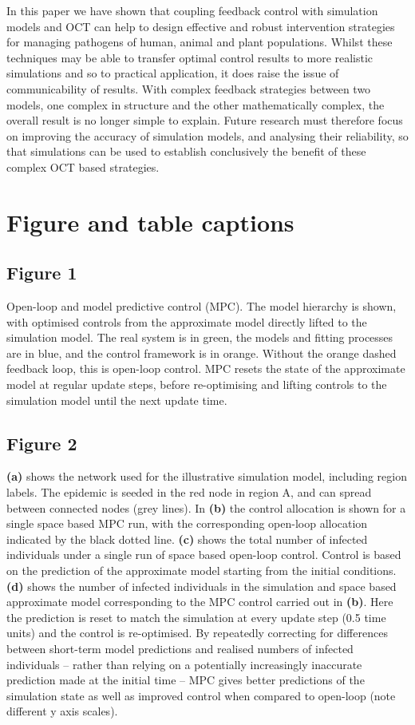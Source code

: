 In this paper we have shown that coupling feedback control with simulation models and OCT can help to design effective and robust intervention strategies for managing pathogens of human, animal and plant populations. Whilst these techniques may be able to transfer optimal control results to more realistic simulations and so to practical application, it does raise the issue of communicability of results. With complex feedback strategies between two models, one complex in structure and the other mathematically complex, the overall result is no longer simple to explain. Future research must therefore focus on improving the accuracy of simulation models, and analysing their reliability, so that simulations can be used to establish conclusively the benefit of these complex OCT based strategies.

\section*{Figure and table captions}

\subsection*{Figure 1}

Open-loop and model predictive control (MPC). The model hierarchy is shown, with optimised controls from the approximate model directly lifted to the simulation model. The real system is in green, the models and fitting processes are in blue, and the control framework is in orange. Without the orange dashed feedback loop, this is open-loop control. MPC resets the state of the approximate model at regular update steps, before re-optimising and lifting controls to the simulation model until the next update time.

\subsection*{Figure 2}

\textbf{(a)} shows the network used for the illustrative simulation model, including region labels. The epidemic is seeded in the red node in region A, and can spread between connected nodes (grey lines). In \textbf{(b)} the control allocation is shown for a single space based MPC run, with the corresponding open-loop allocation indicated by the black dotted line. \textbf{(c)} shows the total number of infected individuals under a single run of space based open-loop control. Control is based on the prediction of the approximate model starting from the initial conditions. \textbf{(d)} shows the number of infected individuals in the simulation and space based approximate model corresponding to the MPC control carried out in \textbf{(b)}. Here the prediction is reset to match the simulation at every update step (0.5 time units) and the control is re-optimised. By repeatedly correcting for differences between short-term model predictions and realised numbers of infected individuals -- rather than relying on a potentially increasingly inaccurate prediction made at the initial time -- MPC gives better predictions of the simulation state as well as improved control when compared to open-loop (note different y axis scales).

